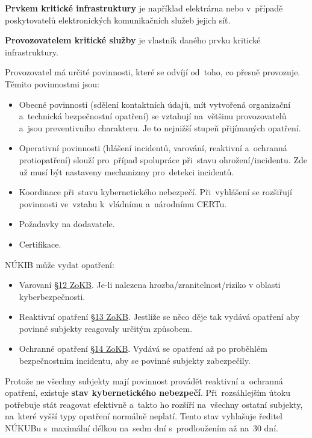 \textbf{Prvkem kritické infrastruktury} je například elektrárna nebo v~případě poskytovatelů elektronických komunikačních služeb jejich síť.

\textbf{Provozovatelem kritické služby} je vlastník daného prvku kritické infrastruktury.

Provozovatel má určité povinnosti, které se odvíjí od~toho, co přesně provozuje. Těmito povinnostmi jsou:

\begin{itemize}
    \item Obecné povinnosti (sdělení kontaktních údajů, mít vytvořená organizační a~technická bezpečnostní opatření) se vztahují na~většinu provozovatelů a~jsou preventivního charakteru. Je to nejnižší stupeň přijímaných opatření.
    \item Operativní povinnosti (hlášení incidentů, varování, reaktivní a~ochranná protiopatření) slouží pro~případ spolupráce při~stavu ohrožení/incidentu. Zde už musí být nastaveny mechanizmy pro~detekci incidentů.
    \item Koordinace při~stavu kybernetického nebezpečí. Při~vyhlášení se rozšiřují povinnosti ve~vztahu k~vládnímu a~národnímu CERTu.
    \item Požadavky na dodavatele.
    \item Certifikace.
\end{itemize}

NÚKIB může vydat opatření:

\begin{itemize}
    \item Varovaní \href{https://www.zakonyprolidi.cz/cs/2014-181#p12}{§12 ZoKB}. Je-li nalezena hrozba/zranitelnost/riziko v oblasti kyberbezpečnosti.
    \item Reaktivní opatření \href{https://www.zakonyprolidi.cz/cs/2014-181#p13}{§13 ZoKB}. Jestliže se něco děje tak vydává opatření aby povinné subjekty reagovaly určitým způsobem.
    \item Ochranné opatření \href{https://www.zakonyprolidi.cz/cs/2014-181#p14}{§14 ZoKB}. Vydává se opatření až po proběhlém bezpečnostním incidentu, aby se povinné subjekty zabezpečily.
\end{itemize}

Protože ne všechny subjekty mají povinnost provádět reaktivní a~ochranná opatření, existuje \textbf{stav kybernetického nebezpečí}. Při~rozsáhlejším útoku potřebuje stát reagovat efektivně a~takto ho rozšíří na~všechny ostatní subjekty, na~které vyšší typy opatření normálně neplatí. Tento stav vyhlašuje ředitel NÚKUBu s~maximální délkou na~sedm dní s~prodloužením až na~30 dní.

